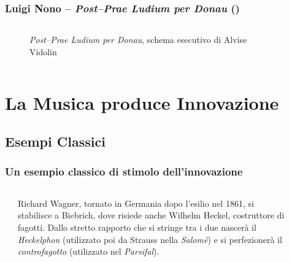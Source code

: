 \documentclass[compress]{beamer}
\newcommand{\esdplay}[2]{\href{run: esdplay \exampledir/#1}{#2 \pgfuseimage{speaker}}}
\begin{document}
\begin{frame}
    \frametitle{Luigi Nono -- \emph{Post--Prae Ludium per Donau} ()} 

    \begin{columns}
        \begin{column}{0.9\textwidth}
            \vspace{-0.6cm}
            \begin{figure}
                \caption{\emph{Post--Prae Ludium per Donau}, schema esecutivo di Alvise Vidolin}
            \end{figure}
        \end{column}
        \begin{column}{0.1\textwidth}
            \esdplay{Delay4_A_misto_rotto_Rev.wav}{}
        \end{column}
    \end{columns}

\end{frame}

\section[Musica $\Rightarrow$ Innovazione]{La Musica produce Innovazione}

\subsection[Classici]{Esempi Classici}

\begin{frame}
    \frametitle{Un esempio classico di stimolo dell'innovazione}

    \begin{columns}[T]
        \begin{column}{0.2\textwidth}
        \end{column}
        \begin{column}{0.5\textwidth}
            Richard Wagner, tornato in Germania dopo l'esilio nel 1861, si
            stabilisce a Biebrich, dove risiede anche Wilhelm Heckel,
            costruttore di fagotti. Dallo stretto rapporto che si stringe tra i due
            nascer\`a il \emph{Heckelphon} (utilizzato poi da Strauss nella
            \emph{Salom\'e}) e si perfezioner\`a il \emph{controfagotto} (utilizzato nel
            \emph{Parsifal}).
        \end{column}
        \begin{column}{0.05\textwidth}
        \end{column}
        \begin{column}{0.1\textwidth}
        \end{column}
    \end{columns}
\end{frame}
\end{document}
